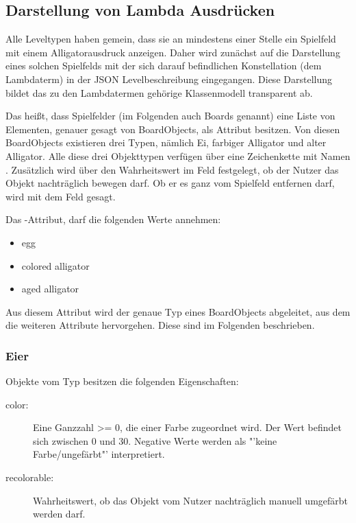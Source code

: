 \subsection{Darstellung von Lambda Ausdrücken}
Alle Leveltypen haben gemein, dass sie an mindestens einer Stelle ein Spielfeld mit einem Alligatorausdruck anzeigen.
Daher wird zunächst auf die Darstellung eines solchen Spielfelds mit der sich darauf befindlichen Konstellation (dem Lambdaterm) in der JSON Levelbeschreibung eingegangen.
Diese Darstellung bildet das zu den Lambdatermen gehörige Klassenmodell transparent ab.


Das heißt, dass Spielfelder (im Folgenden auch Boards genannt) eine Liste von Elementen, genauer gesagt von BoardObjects, als Attribut besitzen.
Von diesen BoardObjects existieren drei Typen, nämlich Ei, farbiger Alligator und alter Alligator.
Alle diese drei Objekttypen verfügen über eine Zeichenkette mit Namen .
Zusätzlich wird über den Wahrheitswert im Feld  festgelegt, ob der Nutzer das Objekt nachträglich bewegen darf.
Ob er es ganz vom Spielfeld entfernen darf, wird mit dem Feld  gesagt.

Das -Attribut, darf die folgenden Werte annehmen:
\begin{itemize}
	\item egg
	\item colored alligator
	\item aged alligator
\end{itemize}
Aus diesem Attribut wird der genaue Typ eines BoardObjects abgeleitet, aus dem die weiteren Attribute hervorgehen.
Diese sind im Folgenden beschrieben.

\subsubsection{Eier}
Objekte vom Typ  besitzen die folgenden Eigenschaften:
\begin{description}
	\item[color:] Eine Ganzzahl >= 0, die einer Farbe zugeordnet wird. Der Wert befindet sich zwischen 0 und 30. Negative Werte werden als "'keine Farbe/ungefärbt"' interpretiert.
	\item[recolorable:] Wahrheitswert, ob das Objekt vom Nutzer nachträglich manuell umgefärbt werden darf.
\end{description}

